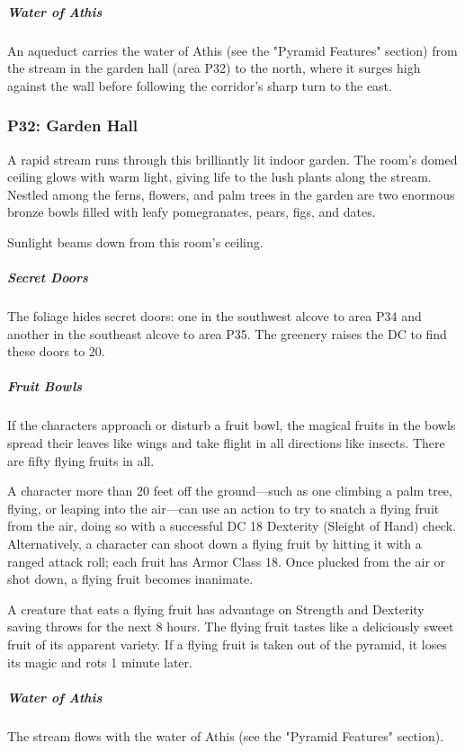 \documentclass[10pt,a4paper,twoside,bg=print,twocolumn,openany,nodeprecatedcode]{dndbook}
\begin{document}
\subparagraph{Water of Athis}
An aqueduct carries the water of Athis (see the "Pyramid Features" section) from the stream in the garden hall (area P32) to the north, where it surges high against the wall before following the corridor's sharp turn to the east.

\subsubsection{P32: Garden Hall}
\begin{DndReadAloud}{}
A rapid stream runs through this brilliantly lit indoor garden. The room's domed ceiling glows with warm light, giving life to the lush plants along the stream. Nestled among the ferns, flowers, and palm trees in the garden are two enormous bronze bowls filled with leafy pomegranates, pears, figs, and dates.

\end{DndReadAloud}

Sunlight beams down from this room's ceiling.

\subparagraph{Secret Doors}
The foliage hides secret doors: one in the southwest alcove to area P34 and another in the southeast alcove to area P35. The greenery raises the DC to find these doors to 20.

\subparagraph{Fruit Bowls}
If the characters approach or disturb a fruit bowl, the magical fruits in the bowls spread their leaves like wings and take flight in all directions like insects. There are fifty flying fruits in all.

A character more than 20 feet off the ground—such as one climbing a palm tree, flying, or leaping into the air—can use an action to try to snatch a flying fruit from the air, doing so with a successful DC 18 Dexterity (Sleight of Hand) check. Alternatively, a character can shoot down a flying fruit by hitting it with a ranged attack roll; each fruit has Armor Class 18. Once plucked from the air or shot down, a flying fruit becomes inanimate.

A creature that eats a flying fruit has advantage on Strength and Dexterity saving throws for the next 8 hours. The flying fruit tastes like a deliciously sweet fruit of its apparent variety. If a flying fruit is taken out of the pyramid, it loses its magic and rots 1 minute later.

\subparagraph{Water of Athis}
The stream flows with the water of Athis (see the "Pyramid Features" section).
\end{document}
